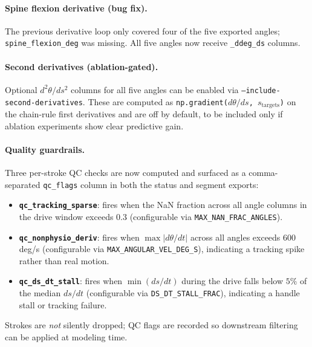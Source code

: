 \documentclass[11pt]{article}
\begin{document}
\paragraph{Spine flexion derivative (bug fix).}
The previous derivative loop only covered four of the five exported angles; \texttt{spine\_flexion\_deg} was missing. All five angles now receive \texttt{\_ddeg\_ds} columns.

\paragraph{Second derivatives (ablation-gated).}
Optional $d^2\theta/ds^2$ columns for all five angles can be enabled via \texttt{--include-second-derivatives}. These are computed as \texttt{np.gradient($d\theta/ds$, $s_{\mathrm{targets}}$)} on the chain-rule first derivatives and are off by default, to be included only if ablation experiments show clear predictive gain.

\paragraph{Quality guardrails.}
Three per-stroke QC checks are now computed and surfaced as a comma-separated \texttt{qc\_flags} column in both the status and segment exports:
\begin{itemize}
	\item \textbf{\texttt{qc\_tracking\_sparse}}: fires when the NaN fraction across all angle columns in the drive window exceeds 0.3 (configurable via \texttt{MAX\_NAN\_FRAC\_ANGLES}).
	\item \textbf{\texttt{qc\_nonphysio\_deriv}}: fires when $\max|d\theta/dt|$ across all angles exceeds $600$\,deg/s (configurable via \texttt{MAX\_ANGULAR\_VEL\_DEG\_S}), indicating a tracking spike rather than real motion.
	\item \textbf{\texttt{qc\_ds\_dt\_stall}}: fires when $\min(ds/dt)$ during the drive falls below $5\%$ of the median $ds/dt$ (configurable via \texttt{DS\_DT\_STALL\_FRAC}), indicating a handle stall or tracking failure.
\end{itemize}
Strokes are \emph{not} silently dropped; QC flags are recorded so downstream filtering can be applied at modeling time.
\end{document}
